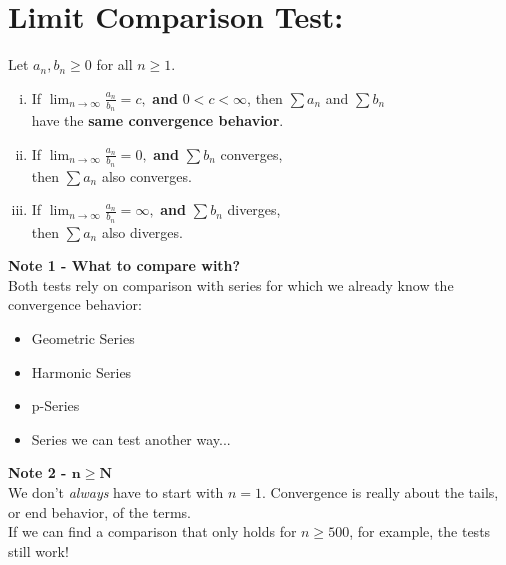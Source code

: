 \section*{Limit Comparison Test:}
Let \(a_n, b_n \geq 0\) for all \(n\geq 1\).
\begin{enumerate}[(i)]
\item If \(\lim_{n\rightarrow \infty} \frac{a_n}{b_n} = c,\) \textbf{and}  \(0<c<\infty\), 
then \(\sum a_n\) and \(\sum b_n\)\\
 have the \textbf{same convergence behavior}.\\ %
 \item If \(\lim_{n\rightarrow \infty} \frac{a_n}{b_n} = 0,\) \textbf{and}
 \(\sum b_n\) converges,\\ then \(\sum a_n\) also converges.\\
  \item If \(\lim_{n\rightarrow \infty} \frac{a_n}{b_n} = \infty,\) \textbf{and}
 \(\sum b_n\) diverges,\\ then \(\sum a_n\) also diverges.\\
\end{enumerate}



\vspace*{.2in}
\setlength{\columnseprule}{0pt}
\setlength{\columnsep}{1em}

\textbf{Note 1 - What to compare with?}\\
Both tests rely on comparison with series for which we already know the convergence behavior:
\begin{itemize}
\item Geometric Series
\item Harmonic Series
\item p-Series
\item Series we can test another way...
\end{itemize}

\textbf{Note 2 - \(\boldsymbol{n\geq N}\)}\\
We don't \textit{always} have to start with \(n=1\). Convergence is really about the tails, or end behavior, of the terms.\\ If we can find a comparison that only holds for \(n\geq 500\), for example, the tests still work!

